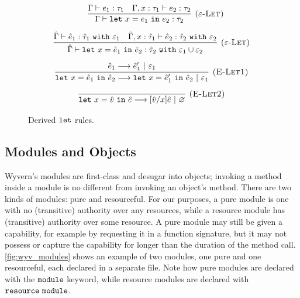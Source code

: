 \begin{figure}[h]

 \\
 \\

\[
\begin{array}{c}

	~~~
	
	\infer[\textsc{($\varepsilon$-Let)}]
	{\Gamma \vdash \letxpr{x}{e_1}{e_2}: \tau_2}
	{\Gamma \vdash e_1: \tau_1 & \Gamma, x: \tau_1 \vdash e_2: \tau_2} \\[2ex]

\infer[\textsc{($\varepsilon$-Let)}]
	{\hat \Gamma \vdash \letxpr{x}{\hat e_1}{\hat e_2} : \hat \tau_2~\kw{with} \varepsilon_1 \cup \varepsilon_2}
	{\hat \Gamma \vdash \hat e_1 : \hat \tau_1~\kw{with} \varepsilon_1 & \hat \Gamma, x: \hat \tau_1 \vdash \hat e_2: \hat \tau_2~\kw{with} \varepsilon_2} \\[2ex]
	
\infer[\textsc{(E-Let1)}]
	{\letxpr{x}{\hat e_1}{\hat e_2} \longrightarrow \letxpr{x}{\hat e_1'}{\hat e_2}~|~\varepsilon_1}
	{\hat e_1 \longrightarrow \hat e_1'~|~\varepsilon_1} \\[2ex]
	
\infer[\textsc{(E-Let2)}]
	{\letxpr{x}{\hat v}{\hat e} \longrightarrow [\hat v/x]\hat e~|~\varnothing}
	{} 

\end{array}
\]

\caption{Derived $\mathtt{let}$ rules.}
\label{fig:let_rules}
\end{figure}
\subsection{Modules and Objects}

Wyvern's modules are first-class and desugar into objects; invoking a method inside a module is no different from invoking an object's method. There are two kinds of modules: pure and resourceful. For our purposes, a pure module is one with no (transitive) authority over any resources, while a resource module has (transitive) authority over some resource. A pure module may still be given a capability, for example by requesting it in a function signature, but it may not possess or capture the capability for longer than the duration of the method call. \ref{fig:wyv_modules} shows an example of two modules, one pure and one resourceful, each declared in a separate file. Note how pure modules are declared with the $\mathtt{module}$ keyword, while resource modules are declared with $\mathtt{resource~module}$.

